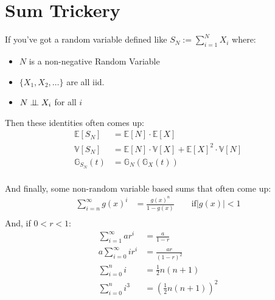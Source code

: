 \section{Sum Trickery}
If you've got a random variable defined like $S_N := \sum_{i=1}^{N} X_i$ where:
\begin{itemize}
    \item $N$ is a non-negative Random Variable
    \item $\{X_1, X_2, \dots\}$ are all iid.
    \item $N \perp \!\!\! \perp X_i$ for all $i$
\end{itemize}
Then these identities often comes up:
\begin{equation*}
    \begin{aligned}
        \mathbb{E}[S_N] &= \mathbb{E}[N] \cdot \mathbb{E}[X] \\
        \mathbb{V}[S_N] &= \mathbb{E}[N] \cdot \mathbb{V}[X] + \mathbb{E}[X]^2
        \cdot \mathbb{V}[N] \\
        \mathbb{G}_{S_N}(t) &= \mathbb{G}_{N}(\mathbb{G}_{X}(t)) \\
    \end{aligned}
\end{equation*}

And finally, some non-random variable based sums that often come up:
\begin{equation*}
    \begin{aligned}
        \sum_{i=n}^{\infty} g(x)^i &= \frac{g(x)^n}{1 - g(x)} \qquad \text{if}
        |g(x)| < 1 \\
    \end{aligned}
\end{equation*}
And, if $0 < r < 1$:
\begin{equation*}
    \begin{aligned}
        \sum_{i=1}^\infty a r^i &= \frac{a}{1 - r} \\
        a \sum_{i=0}^{\infty} ir^i &= \frac{ar}{(1-r)^2}\\
        \sum_{i=0}^n i &= \frac{1}{2} n(n+1)\\
        \sum_{i=0}^{n} i^3 &= \left(  \frac{1}{2} n (n+1)\right)^2 \\
    \end{aligned}
\end{equation*}


